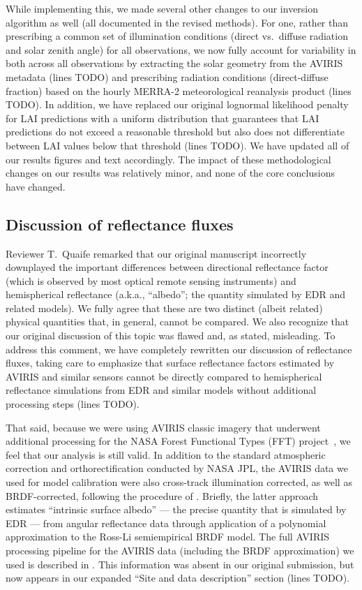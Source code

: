 \documentclass{article}
\begin{document}
While implementing this, we made several other changes to our inversion algorithm as well (all documented in the revised methods).
For one, rather than prescribing a common set of illumination conditions (direct vs.\ diffuse radiation and solar zenith angle) for all observations,
we now fully account for variability in both across all observations by extracting the solar geometry from the AVIRIS metadata (lines TODO) and
prescribing radiation conditions (direct-diffuse fraction) based on the hourly MERRA-2 meteorological reanalysis product (lines TODO).
In addition, we have replaced our original lognormal likelihood penalty for LAI predictions with a uniform distribution that guarantees that LAI predictions do not exceed a reasonable threshold but also does not differentiate between LAI values below that threshold (lines TODO).
We have updated all of our results figures and text accordingly.
The impact of these methodological changes on our results was relatively minor, and none of the core conclusions have changed.

\subsection{Discussion of reflectance fluxes}\label{subsec:brdf}

Reviewer T.\ Quaife remarked that our original manuscript incorrectly downplayed the important differences between directional reflectance factor (which is observed by most optical remote sensing instruments) and hemispherical reflectance (a.k.a., ``albedo''; the quantity simulated by EDR and related models).
We fully agree that these are two distinct (albeit related) physical quantities that, in general, cannot be compared.
We also recognize that our original discussion of this topic was flawed and, as stated, misleading.
To address this comment, we have completely rewritten our discussion of reflectance fluxes, taking care to emphasize that surface reflectance factors estimated by AVIRIS and similar sensors cannot be directly compared to hemispherical reflectance simulations from EDR and similar models without additional processing steps (lines TODO).

That said, because we were using AVIRIS classic imagery that underwent additional processing for the NASA Forest Functional Types (FFT) project~\citep{singh2015imaging}, we feel that our analysis is still valid.
In addition to the standard atmospheric correction and orthorectification conducted by NASA JPL, the AVIRIS data we used for model calibration were also cross-track illumination corrected, as well as BRDF-corrected, following the procedure of \citet{lucht2000algorithm}.
Briefly, the latter approach estimates “intrinsic surface albedo” --- the precise quantity that is simulated by EDR --- from angular reflectance data through application of a polynomial approximation to the Ross-Li semiempirical BRDF model.
The full AVIRIS processing pipeline for the  AVIRIS data (including the BRDF approximation) we used is described in \citet{singh2015imaging}.
This information was absent in our original submission, but now appears in our expanded ``Site and data description'' section (lines TODO).
\end{document}
